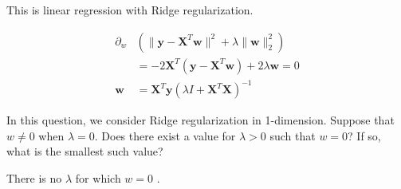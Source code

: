 This is linear regression with Ridge regularization.

\begin{subsolution}
  \begin{align}
    \partial_w &\left( \|\textbf{y} - \textbf{X}^{T}\textbf{w}\|^2 + \lambda\|\textbf{w}\|_2^2\right) \\
    &= -2\textbf{X}^T (\textbf{y} - \textbf{X}^{T}\textbf{w}) + 2\lambda\textbf{w} = 0 \\
  \textbf{w} &= \textbf{X}^T\textbf{y}(\lambda I + \textbf{X}^T\textbf{X})^{-1}
    \end{align} 
\end{subsolution}

\subproblem In this question, we consider Ridge regularization in 1-dimension. Suppose that $w \neq 0$ when $\lambda = 0$. Does there exist a value for $\lambda > 0$ such that $w = 0$? If so, what is the smallest such value?

\begin{subsolution}
 There is no $\lambda$ for which $w=0$ .
\end{subsolution}



